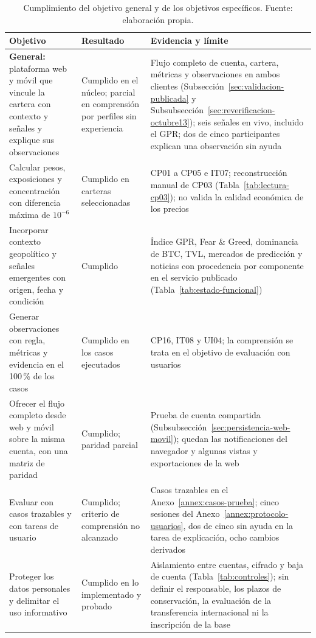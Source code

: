 \begin{table}[ht]
\caption{Cumplimiento del objetivo general y de los objetivos específicos. Fuente: elaboración propia.}\label{tab:objetivos-resultado}
\centering\footnotesize\renewcommand{\arraystretch}{1.2}
\begin{tabular}{>{\raggedright\arraybackslash}p{4.2cm}>{\raggedright\arraybackslash}p{2.8cm}>{\raggedright\arraybackslash}p{7.2cm}}\hline
\textbf{Objetivo} & \textbf{Resultado} & \textbf{Evidencia y límite}\\\hline
\textbf{General:} plataforma web y móvil que vincule la cartera con contexto y señales y explique sus observaciones & Cumplido en el núcleo; parcial en comprensión por perfiles sin experiencia & Flujo completo de cuenta, cartera, métricas y observaciones en ambos clientes (Subsección~\ref{sec:validacion-publicada} y Subsubsección~\ref{sec:reverificacion-octubre13}); seis señales en vivo, incluido el GPR; dos de cinco participantes explican una observación sin ayuda\\
Calcular pesos, exposiciones y concentración con diferencia máxima de $10^{-6}$ & Cumplido en carteras seleccionadas & CP01 a CP05 e IT07; reconstrucción manual de CP03 (Tabla~\ref{tab:lectura-cp03}); no valida la calidad económica de los precios\\
Incorporar contexto geopolítico y señales emergentes con origen, fecha y condición & Cumplido & Índice GPR, Fear \& Greed, dominancia de BTC, TVL, mercados de predicción y noticias con procedencia por componente en el servicio publicado (Tabla~\ref{tab:estado-funcional})\\
Generar observaciones con regla, métricas y evidencia en el 100\,\% de los casos & Cumplido en los casos ejecutados & CP16, IT08 y UI04; la comprensión se trata en el objetivo de evaluación con usuarios\\
Ofrecer el flujo completo desde web y móvil sobre la misma cuenta, con una matriz de paridad & Cumplido; paridad parcial & Prueba de cuenta compartida (Subsubsección~\ref{sec:persistencia-web-movil}); quedan las notificaciones del navegador y algunas vistas y exportaciones de la web\\
Evaluar con casos trazables y con tareas de usuario & Cumplido; criterio de comprensión no alcanzado & Casos trazables en el Anexo~\ref{annex:casos-prueba}; cinco sesiones del Anexo~\ref{annex:protocolo-usuarios}, dos de cinco sin ayuda en la tarea de explicación, ocho cambios derivados\\
Proteger los datos personales y delimitar el uso informativo & Cumplido en lo implementado y probado & Aislamiento entre cuentas, cifrado y baja de cuenta (Tabla~\ref{tab:controles}); sin definir el responsable, los plazos de conservación, la evaluación de la transferencia internacional ni la inscripción de la base\\\hline
\end{tabular}
\end{table}

